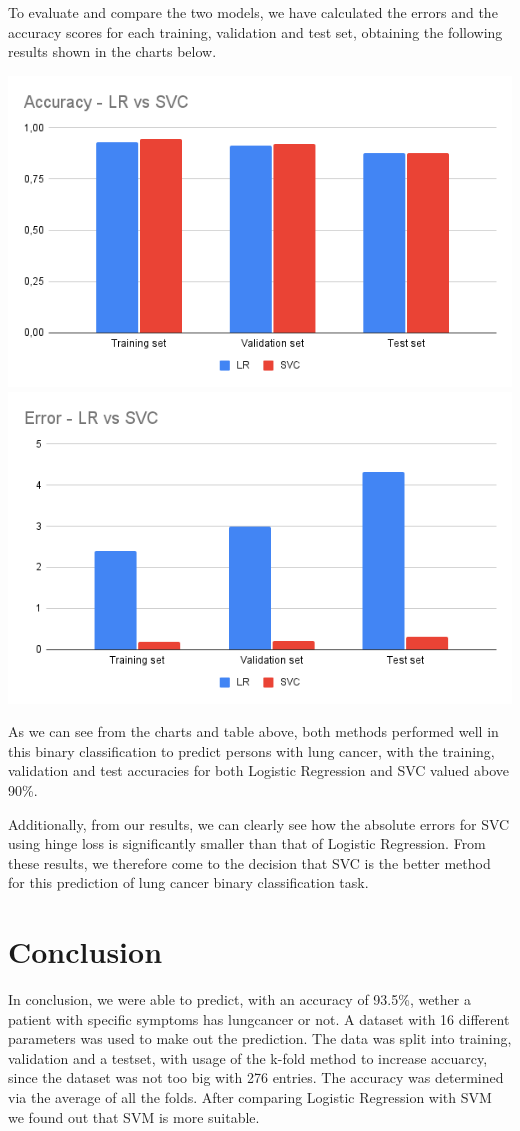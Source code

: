 \documentclass[a4paper,12pt]{article}
\begin{document}
To evaluate and compare the two models, we have calculated the errors and the accuracy scores for each training, validation and test set, obtaining the following results shown in the charts below.

\includegraphics[height=0.3\textwidth]{./graphs/accuracy_chart.png}
\includegraphics[height=0.3\textwidth]{./graphs/error_chart.png}

As we can see from the charts and table above, both methods performed well in this binary classification to predict persons with lung cancer, with the training, validation and test accuracies for both Logistic Regression and SVC valued above 90\%.

Additionally, from our results, we can clearly see how the absolute errors for SVC using hinge loss is significantly smaller than that of Logistic Regression.
From these results, we therefore come to the decision that SVC is the better method for this prediction of lung cancer binary classification task.

\section{Conclusion}
\label{sec:org9ea179d}

In conclusion, we were able to predict, with an accuracy of 93.5\%, wether a patient with specific symptoms has lungcancer or not.
A dataset with 16 different parameters was used to make out the prediction.
The data was split into training, validation and a testset, with usage of the k-fold method to increase accuarcy, since the dataset was not too big with 276 entries.
The accuracy was determined via the average of all the folds.
After comparing Logistic Regression with SVM we found out that SVM is more suitable.
\end{document}
